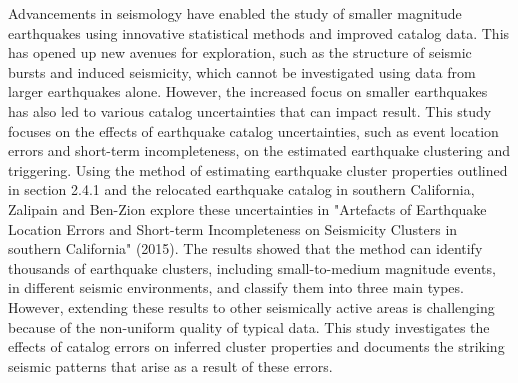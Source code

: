 \documentclass[12pt]{article} %
\theoremstyle{plain}
\begin{document}
	Advancements in seismology have enabled the study of smaller magnitude earthquakes using innovative statistical methods and improved catalog data. This has opened up new avenues for exploration, such as the structure of seismic bursts and induced seismicity, which cannot be investigated using data from larger earthquakes alone. However, the increased focus on smaller earthquakes has also led to various catalog uncertainties that can impact result. This study focuses on the effects of earthquake catalog uncertainties, such as event location errors and short-term incompleteness, on the estimated earthquake clustering and triggering. Using the method of estimating earthquake cluster properties outlined in section 2.4.1 and the relocated earthquake catalog in southern California, Zalipain and Ben-Zion explore these uncertainties in "Artefacts of Earthquake Location Errors and Short-term Incompleteness on Seismicity Clusters in southern California" (2015). The results showed that the method can identify thousands of earthquake clusters, including small-to-medium magnitude events, in different seismic environments, and classify them into three main types. However, extending these results to other seismically active areas is challenging because of the non-uniform quality of typical data. This study investigates the effects of catalog errors on inferred cluster properties and documents the striking seismic patterns that arise as a result of these errors.
	
	
\end{document}
